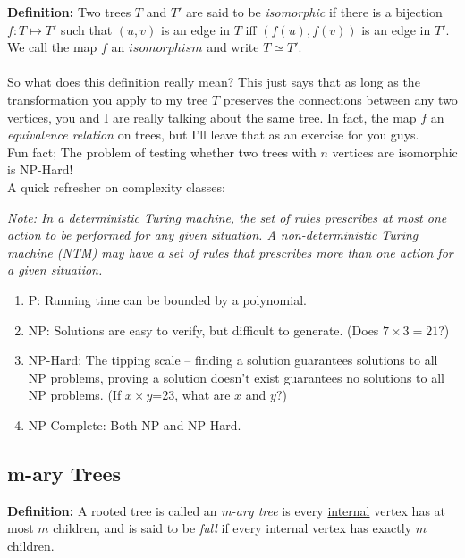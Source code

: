 \documentclass[a4paper,10pt]{report}
\begin{document}
\textbf{Definition: } Two trees $T$ and $T'$ are said to be \textit{isomorphic} if there is a bijection $f:T\mapsto T'$ such that $(u,v)$ is an edge in $T$ iff $(f(u), f(v))$ is an edge in $T'$. We call the map $f$ an $isomorphism$ and write $T\simeq T'$.\\ \\

So what does this definition really mean? This just says that as long as the transformation you apply to my tree $T$ preserves the connections between any two vertices, you and I are really talking about the same tree. In fact, the map $f$ an \textit{equivalence relation} on trees, but I'll leave that as an exercise for you guys.\\

Fun fact; The problem of testing whether two trees with $n$ vertices are isomorphic is NP-Hard!\\

A quick refresher on complexity classes:

\textit{Note: In a deterministic Turing machine, the set of rules prescribes at most one action to be performed for any given situation. A non-deterministic Turing machine (NTM) may have a set of rules that prescribes more than one action for a given situation.}

\begin{enumerate}
	\item P: Running time can be bounded by a polynomial.
	\item NP: Solutions are easy to verify, but difficult to generate. (Does $7\times3=21$?)
	\item NP-Hard: The tipping scale -- finding a solution guarantees solutions to all NP problems, proving a solution doesn't exist guarantees no solutions to all NP problems. (If $x\times y$=23, what are $x$ and $y$?)
	\item NP-Complete: Both NP and NP-Hard.
\end{enumerate}



\subsection{m-ary Trees}

\textbf{Definition: } A rooted tree is called an \textit{m-ary tree} is every \underline{internal} vertex has at most $m$ children, and is said to be \textit{full} if every internal vertex has exactly $m$ children.
\end{document}

